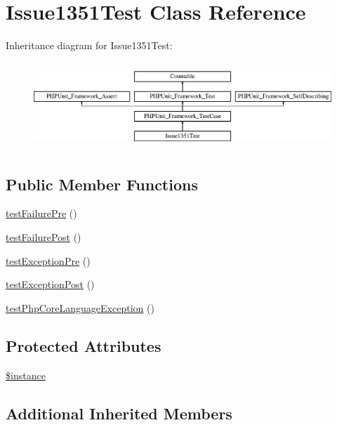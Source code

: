 \hypertarget{class_issue1351_test}{}\section{Issue1351\+Test Class Reference}
\label{class_issue1351_test}
Inheritance diagram for Issue1351\+Test\+:\begin{figure}[H]
\begin{center}
\leavevmode
\includegraphics[height=3.303835cm]{class_issue1351_test}
\end{center}
\end{figure}
\subsection*{Public Member Functions}
\begin{DoxyCompactItemize}
\item 
\mbox{\hyperlink{class_issue1351_test_a912bb3b4de17ae9471d4930526c50920}{test\+Failure\+Pre}} ()
\item 
\mbox{\hyperlink{class_issue1351_test_a985e889520bc1284e65de1cd6ece8f6d}{test\+Failure\+Post}} ()
\item 
\mbox{\hyperlink{class_issue1351_test_afbc4d0cb8f448a270aa343bb33a5bdb1}{test\+Exception\+Pre}} ()
\item 
\mbox{\hyperlink{class_issue1351_test_a7be93b3a58825b221ce2b6e8bdeb1b6d}{test\+Exception\+Post}} ()
\item 
\mbox{\hyperlink{class_issue1351_test_a2cd341df148827467dc379b4ddb833f7}{test\+Php\+Core\+Language\+Exception}} ()
\end{DoxyCompactItemize}
\subsection*{Protected Attributes}
\begin{DoxyCompactItemize}
\item 
\mbox{\hyperlink{class_issue1351_test_ad9d7ce33ebb142b70e58b68052ca0ea8}{\$instance}}
\end{DoxyCompactItemize}
\subsection*{Additional Inherited Members}


